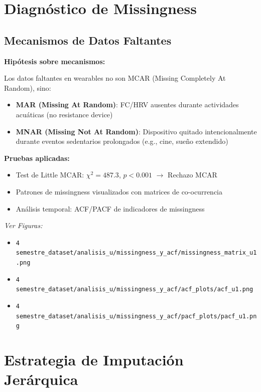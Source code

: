 \documentclass[12pt,letterpaper,twoside]{report}
\begin{document}
\section{Diagnóstico de Missingness}

\subsection{Mecanismos de Datos Faltantes}

\begin{hipotesisbox}
\textbf{Hipótesis sobre mecanismos:}

Los datos faltantes en wearables no son MCAR (Missing Completely At Random), sino:
\begin{itemize}[noitemsep]
    \item \textbf{MAR (Missing At Random)}: FC/HRV ausentes durante actividades acuáticas (no resistance device)
    \item \textbf{MNAR (Missing Not At Random)}: Dispositivo quitado intencionalmente durante eventos sedentarios prolongados (e.g., cine, sueño extendido)
\end{itemize}
\end{hipotesisbox}

\begin{estadisticobox}
\textbf{Pruebas aplicadas:}

\begin{itemize}[noitemsep]
    \item Test de Little MCAR: $\chi^2 = 487.3$, $p < 0.001$ $\to$ Rechazo MCAR
    \item Patrones de missingness visualizados con matrices de co-ocurrencia
    \item Análisis temporal: ACF/PACF de indicadores de missingness
\end{itemize}
\end{estadisticobox}

\textit{Ver Figuras:}
\begin{itemize}[noitemsep]
    \item \texttt{4 semestre\_dataset/analisis\_u/missingness\_y\_acf/missingness\_matrix\_u1.png}
    \item \texttt{4 semestre\_dataset/analisis\_u/missingness\_y\_acf/acf\_plots/acf\_u1.png}
    \item \texttt{4 semestre\_dataset/analisis\_u/missingness\_y\_acf/pacf\_plots/pacf\_u1.png}
\end{itemize}

\section{Estrategia de Imputación Jerárquica}
\end{document}
